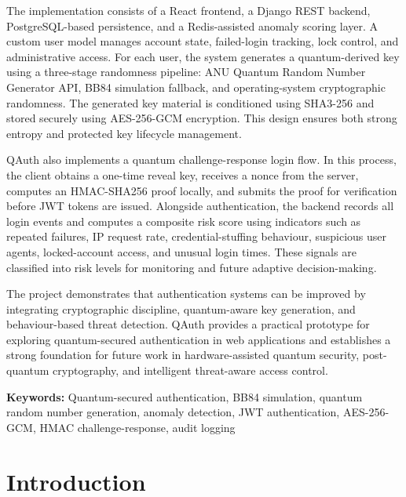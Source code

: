 \documentclass[12pt,a4paper]{report}
\begin{document}
The implementation consists of a React frontend, a Django REST backend, PostgreSQL-based persistence, and a Redis-assisted anomaly scoring layer. A custom user model manages account state, failed-login tracking, lock control, and administrative access. For each user, the system generates a quantum-derived key using a three-stage randomness pipeline: ANU Quantum Random Number Generator API, BB84 simulation fallback, and operating-system cryptographic randomness. The generated key material is conditioned using SHA3-256 and stored securely using AES-256-GCM encryption. This design ensures both strong entropy and protected key lifecycle management.

QAuth also implements a quantum challenge-response login flow. In this process, the client obtains a one-time reveal key, receives a nonce from the server, computes an HMAC-SHA256 proof locally, and submits the proof for verification before JWT tokens are issued. Alongside authentication, the backend records all login events and computes a composite risk score using indicators such as repeated failures, IP request rate, credential-stuffing behaviour, suspicious user agents, locked-account access, and unusual login times. These signals are classified into risk levels for monitoring and future adaptive decision-making.

The project demonstrates that authentication systems can be improved by integrating cryptographic discipline, quantum-aware key generation, and behaviour-based threat detection. QAuth provides a practical prototype for exploring quantum-secured authentication in web applications and establishes a strong foundation for future work in hardware-assisted quantum security, post-quantum cryptography, and intelligent threat-aware access control.

\vspace{0.4em}
\noindent\textbf{Keywords:}
Quantum-secured authentication, BB84 simulation, quantum random number generation, anomaly detection, JWT authentication, AES-256-GCM, HMAC challenge-response, audit logging

\tableofcontents
\listoffigures
\listoftables

\newpage

\chapter{Introduction}
\end{document}
